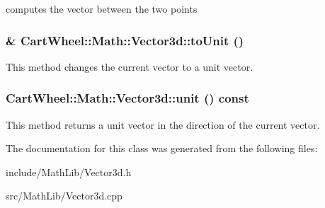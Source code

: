 \label{classCartWheel_1_1Math_1_1Vector3d_a04d88c2c27b0289d67dddbb9247f181d}
computes the vector between the two points \hypertarget{classCartWheel_1_1Math_1_1Vector3d_af4cfde7678c0584227451f761effdab5}{
\subsubsection[{toUnit}]{\& CartWheel::Math::Vector3d::toUnit ()}}
\label{classCartWheel_1_1Math_1_1Vector3d_af4cfde7678c0584227451f761effdab5}
This method changes the current vector to a unit vector. \hypertarget{classCartWheel_1_1Math_1_1Vector3d_a786026642333f9bcbdfdb69ec40c27a7}{
\subsubsection[{unit}]{ CartWheel::Math::Vector3d::unit () const}}
\label{classCartWheel_1_1Math_1_1Vector3d_a786026642333f9bcbdfdb69ec40c27a7}
This method returns a unit vector in the direction of the current vector. 

The documentation for this class was generated from the following files:\begin{DoxyCompactItemize}
\item 
include/MathLib/Vector3d.h\item 
src/MathLib/Vector3d.cpp\end{DoxyCompactItemize}
